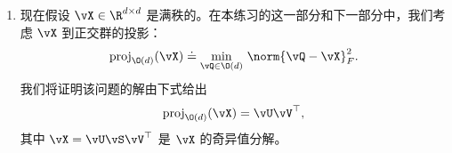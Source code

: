 \documentclass[../../book-main_zh.tex]{subfiles}
\begin{document}
\begin{exercise}
\begin{enumerate}
            \begin{equation}\label{eq:exercise-riemann-hess-orthogonal-group}
                \mathrm{Hess}\, f(\vQ) = \cP_{T_{\vQ}\O(d)} \left(
                    \nabla^2 f(\vQ) - \Symm(\vQ^\top \nabla f(\vQ)) \kron \vI
                \right) \cP_{T_{\vQ}\O(d)},
            \end{equation}
            其中 $\Symm(\vDelta) = \tfrac{1}{2}(\vDelta +
            \vDelta^\top)$ 表示到对称矩阵集合的正交投影，$\kron$ 表示矩阵的克罗内克积（Kronecker product）。
            请注意，将前一个表达式中出现的算子解释为\textit{在 ${d \times d}$
            矩阵上的线性变换}，而\textbf{不是} $d \times d$ 矩阵本身。
            优化问题
            \eqref{eq:exercise-orthogonal-group-constrained-max}
            的\textit{二阶最优性条件}可以用黎曼海森矩阵表示：
            \begin{equation*}
                \mathrm{Hess}\, f(\vQ) \preceq \mathbf{0}.
            \end{equation*}
            对于最小化问题，符号反转。

            \textit{（提示：关键是操作计算以获得尽可能紧凑的形式
                \eqref{eq:exercise-riemann-hess-orthogonal-group}。为此，利用克罗内克积的以下同构：如果
                $\vA$、$\vX$ 和 $\vB$ 是兼容尺寸的矩阵，那么有
                \begin{equation*}
                    (\vB^\top \kron \vA) \Vec(\vX) = \Vec(\vA \vX \vB),
                \end{equation*}
                其中 $\Vec(\vX)$ 表示将矩阵参数的列“从左到右”堆叠成一个向量。我们在
                \eqref{eq:exercise-riemann-hess-orthogonal-group}
            中使用这种同构，以便以规范的方式将两个矩阵的克罗内克积定义为矩阵上的算子。）}

        \item 现在假设 $\vX \in \R^{d\times d}$ 是满秩的。在本练习的这一部分和下一部分中，我们考虑
            $\vX$ 到正交群的投影：
            \begin{equation}\label{eq:projection-onto-ogrp-defn}
                \mathrm{proj}_{\O(d)}(\vX) \doteq
                \min_{\vQ \in \O(d)
                }\, \norm{\vQ - \vX}_F^2.
            \end{equation}
            我们将证明该问题的解由下式给出
            \begin{equation*}
                \mathrm{proj}_{\O(d)}(\vX)
                =
                \vU \vV^\top,
            \end{equation*}
            其中 $\vX = \vU \vS \vV^\top$ 是 $\vX$ 的奇异值分解。


\end{enumerate}
\end{exercise}
\end{document}
